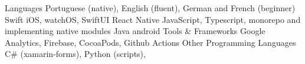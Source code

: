 \begin{cvskills}
  \cvskill
    {Languages}
    {Portuguese (native), English (fluent), German and French (beginner)}
  \cvskill
    {Swift}
    {iOS, watchOS, SwiftUI}
    \cvskill
    {React Native}
    {JavaScript, Typescript, monorepo and implementing native modules}
  \cvskill
    {Java}
    {android}
   \cvskill
    {Tools \& Frameworks}
    {Google Analytics, Firebase, CocoaPods, Github Actions}
   \cvskill
     {Other Programming Languages}
     {C\# (xamarin-forms), Python (scripts), }
\end{cvskills}
